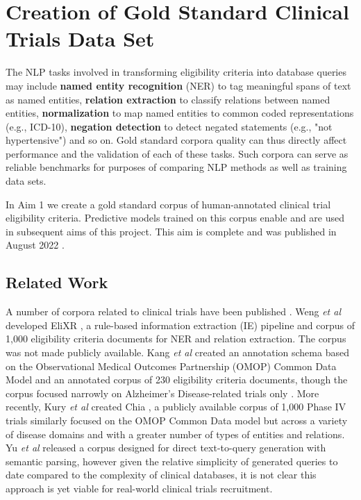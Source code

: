 \documentclass[../main.tex]{subfiles}
\begin{document}
\section{Creation of Gold Standard Clinical Trials Data Set}

The NLP tasks involved in transforming eligibility criteria into database queries may include \textbf{named entity recognition} (NER) to tag meaningful spans of text as named entities, \textbf{relation extraction} to classify relations between named entities, \textbf{normalization} to map named entities to common coded representations (e.g., ICD-10), \textbf{negation detection} to detect negated statements (e.g., "not hypertensive") and so on. Gold standard corpora quality can thus directly affect performance and the validation of each of these tasks. Such corpora can serve as reliable benchmarks for purposes of comparing NLP methods as well as training data sets. 

In Aim 1 we create a gold standard corpus of human-annotated clinical trial eligibility criteria. Predictive models trained on this corpus enable and are used in subsequent aims of this project. This aim is complete and was published in August 2022 \cite{dobbins2022leaf}.

\subsection{Related Work}

A number of corpora related to clinical trials have been published \cite{kury2020chia, kang2017eliie, weng2011elixr, yu2020}. Weng \textit{et al} developed EliXR \cite{weng2011elixr}, a rule-based information extraction (IE) pipeline and corpus of 1,000 eligibility criteria documents for NER and relation extraction. The corpus was not made publicly available. Kang \textit{et al} created an annotation schema based on the Observational Medical Outcomes Partnership (OMOP) Common Data Model \cite{hripcsak2015observational} and an annotated corpus of 230 eligibility criteria documents, though the corpus focused narrowly on Alzheimer's Disease-related trials only \cite{kang2017eliie}. More recently, Kury \textit{et al} created Chia \cite{kury2020chia}, a publicly available corpus of 1,000 Phase IV trials similarly focused on the OMOP Common Data model but across a variety of disease domains and with a greater number of types of entities and relations. Yu \textit{et al} \cite{yu2020} released a corpus designed for direct text-to-query generation with semantic parsing, however given the relative simplicity of generated queries to date compared to the complexity of clinical databases, it is not clear this approach is yet viable for real-world clinical trials recruitment.
\end{document}
